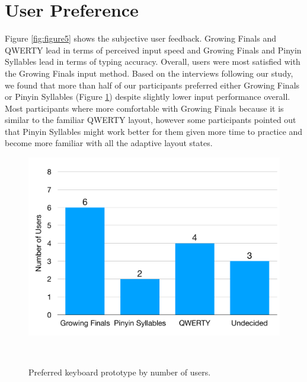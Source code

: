 \section{User Preference}
Figure \ref{fig:figure5} shows the subjective user feedback. Growing Finals and QWERTY lead in terms of perceived input speed and Growing Finals and Pinyin Syllables lead in terms of typing accuracy. Overall, users were most satisfied with the Growing Finals input method.
Based on the interviews following our study, we found that more than half of our participants preferred either Growing Finals or Pinyin Syllables (Figure \ref{fig:figure6}) despite slightly lower input performance overall. Most participants where more comfortable with Growing Finals because it is similar to the familiar QWERTY layout, however some participants pointed out that Pinyin Syllables might work better for them given more time to practice and become more familiar with all the adaptive layout states.



\begin{figure}
  \centering
  \includegraphics[width=1\columnwidth]{figures/ime_prefs}
  \caption{Preferred keyboard prototype by number of users.}~\label{fig:figure6}
\end{figure}



